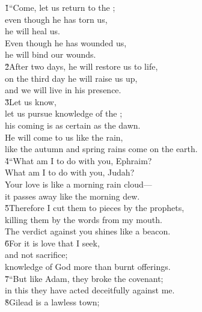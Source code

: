 \begin{poetry}
\poeml {}
\v{1}``Come, let us return to the ; \\
\poemll    even though he has torn us, \\
\poemlll       he will heal us. \\
\poeml Even though he has wounded us, \\
\poemll    he will bind our wounds. \\
\poeml \v{2}After two days, he will restore us to life, \\
\poemll    on the third day he will raise us up, \\
\poemlll       and we will live in his presence. \\
\poeml \v{3}Let us know, \\
\poemll    let us pursue knowledge of the ; \\
\poemlll       his coming is as certain as the dawn. \\
\poeml He will come to us like the rain, \\
\poemll    like the autumn and spring rains come on the earth. \\
\poeml \v{4}``What am I to do with you, Ephraim? \\
\poemll    What am I to do with you, Judah? \\
\poeml Your love is like a morning rain cloud--- \\
\poemll    it passes away like the morning dew. \\
\poeml \v{5}Therefore I cut them to pieces by the prophets, \\
\poemll    killing them by the words from my mouth. \\
\poemlll       The verdict against you shines like a beacon. \\
\poeml \v{6}For it is love that I seek, \\
\poemll    and not sacrifice; \\
\poemlll       knowledge of God more than burnt offerings. \\
\poeml \v{7}``But like Adam, they broke the covenant; \\
\poemll    in this they have acted deceitfully against me. \\
\poeml \v{8}Gilead is a lawless town; \\

\end{poetry}
